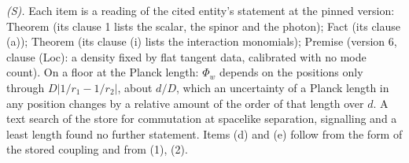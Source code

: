 \emph{(S).} Each item is a reading of the cited entity's statement at the pinned version: Theorem  (its clause 1 lists the scalar, the spinor and the photon); Fact  (its clause (a)); Theorem  (its clause (i) lists the interaction monomials); Premise  (version 6, clause (Loc): a density fixed by flat tangent data, calibrated with no mode count). On a floor at the Planck length: $\Phi_{w}$ depends on the positions only through $D|1/r_{1} - 1/r_{2}|$, about $d/D$, which an uncertainty of a Planck length in any position changes by a relative amount of the order of that length over $d$. A text search of the store for commutation at spacelike separation, signalling and a least length found no further statement. Items (d) and (e) follow from the form of the stored coupling and from (1), (2).
